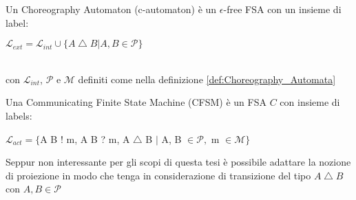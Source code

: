 \begin{definition} \label{def:Choreography_Automata_Ext}
    Un Choreography Automaton (c-automaton) è un $\epsilon$-free FSA con un insieme di label:\bigskip \\
    \centerline{$\mathcal{L}_{ext} = \mathcal{L}_{int} \cup \{ A \bigtriangleup B | A, B \in \mathcal{P}\}$} \bigskip \\
    con $\mathcal{L}_{int}$, $\mathcal{P}$ e $\mathcal{M}$ definiti come nella definizione \ref{def:Choreography_Automata}
\end{definition}

\begin{definition}
    Una Communicating Finite State Machine (CFSM) è un FSA $C$ con insieme di labels:
    \bigskip \\
    \centerline{$\mathcal{L}_{act} = \{$A B ! m, A B ? m, A $\bigtriangleup$ B $|$ A, B $ \in \mathcal{P},$ m $ \in \mathcal{M}\}$}
\end{definition}

\begin{remark}
    Seppur non interessante per gli scopi di questa tesi è possibile adattare la nozione di proiezione in modo che tenga in considerazione di transizione del tipo $A \bigtriangleup B$ con $A, B \in \mathcal{P}$
\end{remark}


